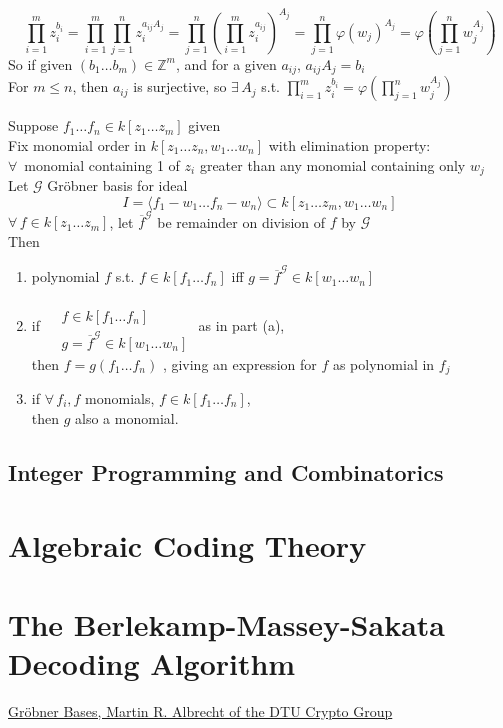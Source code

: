 \[
\prod_{i=1}^m z_i^{b_i} = \prod_{i=1}^m \prod_{j=1}^n z_i^{ a_{ij} A_j } = \prod_{j=1}^n \left( \prod_{i=1}^m z_i^{a_{ij}} \right)^{A_j} = \prod_{j=1}^n \varphi(w_j)^{A_j} = \varphi\left( \prod_{j=1}^n w_j^{A_j} \right)
\]
So if given $(b_1 \dots b_m) \in \mathbb{Z}^m$, and for a given $a_{ij}$, $a_{ij}A_j = b_i$ \\

For $m\leq n$, then $a_{ij}$ is surjective, so $\exists \, A_j$ s.t. $\prod_{i=1}^m z_i^{b_i} = \varphi\left( \prod_{j=1}^n w_j^{A_j} \right)$



\begin{proposition}[1.8]
Suppose $f_1 \dots f_n \in k[z_1 \dots z_m]$ given \\
Fix monomial order in $k[z_1 \dots z_n, w_1 \dots w_n ]$ with elimination property: \\
$\forall \, $ monomial containing 1 of $z_i$ greater than any monomial containing only $w_j$ \\

Let $\mathcal{G}$ Gr\"{o}bner basis for ideal
\[
I = \langle f_1 - w_1 \dots f_n - w_n \rangle \subset k[z_1 \dots z_m, w_1 \dots w_n]
\]
$\forall \, f \in k[z_1 \dots z_m]$, let $\overline{f}^{ \mathcal{G}}$ be remainder on division of $f$ by $\mathcal{G}$ \\
Then
\begin{enumerate}
\item[(a)] polynomial $f$ s.t. $f\in k[f_1 \dots f_n]$ iff $g= \overline{f}^{ \mathcal{G}} \in k[w_1 \dots w_n]$
\item[(b)] if $\begin{aligned} & \quad \\
  & f \in k [f_1 \dots f_n ] \\
  & g = \overline{f}^{\mathcal{G}}\in k[ w_1 \dots w_n] \end{aligned}$ \quad as in part (a), \\

then $f = g(f_1 \dots f_n)$ , giving an expression for $f$ as polynomial in $f_j$
\item[(c)] if $\forall \, f_i, f$ monomials, $f\in k[f_1 \dots f_n]$, \\
then $g$ also a monomial.  
\end{enumerate}
\end{proposition}



\subsection{Integer Programming and Combinatorics}



\section{Algebraic Coding Theory}


\section{The Berlekamp-Massey-Sakata Decoding Algorithm}





\href{https://martinralbrecht.files.wordpress.com/2010/07/20131022_buchberger_dtu.pdf}{Gr\"{o}bner Bases, Martin R. Albrecht of the DTU Crypto Group}

